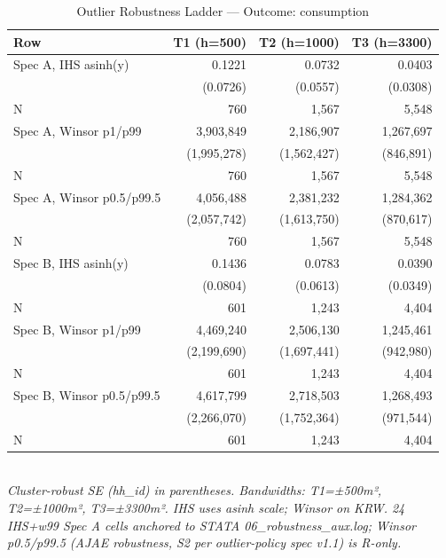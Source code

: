 \begin{table}[t]
\centering
\caption{Outlier Robustness Ladder — Outcome: consumption}
\label{tab:rob_outlier_consumption_en}
\begin{tabular}{lrrr}
\toprule
Row & T1 (h=500) & T2 (h=1000) & T3 (h=3300) \\
\midrule
Spec A, IHS asinh(y) & 0.1221 & 0.0732 & 0.0403 \\
        & (0.0726) & (0.0557) & (0.0308) \\
N       & 760 & 1,567 & 5,548 \\
Spec A, Winsor p1/p99 & 3,903,849 & 2,186,907 & 1,267,697 \\
        & (1,995,278) & (1,562,427) & (846,891) \\
N       & 760 & 1,567 & 5,548 \\
Spec A, Winsor p0.5/p99.5 & 4,056,488 & 2,381,232 & 1,284,362 \\
        & (2,057,742) & (1,613,750) & (870,617) \\
N       & 760 & 1,567 & 5,548 \\
Spec B, IHS asinh(y) & 0.1436 & 0.0783 & 0.0390 \\
        & (0.0804) & (0.0613) & (0.0349) \\
N       & 601 & 1,243 & 4,404 \\
Spec B, Winsor p1/p99 & 4,469,240 & 2,506,130 & 1,245,461 \\
        & (2,199,690) & (1,697,441) & (942,980) \\
N       & 601 & 1,243 & 4,404 \\
Spec B, Winsor p0.5/p99.5 & 4,617,799 & 2,718,503 & 1,268,493 \\
        & (2,266,070) & (1,752,364) & (971,544) \\
N       & 601 & 1,243 & 4,404 \\
\bottomrule
\end{tabular}
\\
\footnotesize\textit{Cluster-robust SE (hh_id) in parentheses. Bandwidths: T1=±500m², T2=±1000m², T3=±3300m². IHS uses asinh scale; Winsor on KRW. 24 IHS+w99 Spec A cells anchored to STATA 06_robustness_aux.log; Winsor p0.5/p99.5 (AJAE robustness, S2 per outlier-policy spec v1.1) is R-only.}
\end{table}


